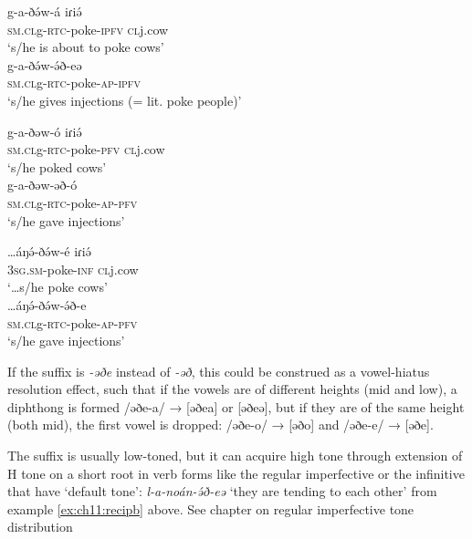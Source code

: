 \ea
\ea \gll 	g-a-ðə́w-á 			iɾiə́  		\\
	\textsc{sm.cl}g-\textsc{rtc}-poke-\textsc{ipfv}  	\textsc{cl}j.cow\\
	\trans ‘s/he is about to poke cows’\\

\ex \gll	g-a-ðə́w-ə́ð-eə  		\\
	\textsc{sm.cl}g-\textsc{rtc}-poke-\textsc{ap-\textsc{ipfv}}  \\
	\trans ‘s/he gives injections (= lit.  poke people)’\\ \label{ex:ch11:eab}

\ex \gll 	g-a-ðəw-ó 			iɾiə́		\\
	\textsc{sm.cl}g-\textsc{rtc}-poke-\textsc{pfv}  		\textsc{cl}j.cow\\
	\trans 	‘s/he poked cows’\\

\ex \gll 	g-a-ðəw-əð-ó		\\
	\textsc{sm.cl}g-\textsc{rtc}-poke-\textsc{ap-\textsc{pfv}}  		 \\
	\trans ‘s/he gave injections’\\ \label{ex:ch11:eab}

\ex \gll 	…áŋə́-ðə́w-é 			iɾiə́		\\
	3\textsc{sg.sm}-poke-\textsc{inf}  		\textsc{cl}j.cow\\
	\trans 	‘…s/he poke cows’\\

\ex \gll 	…áŋə́-ðə́w-ə́ð-e	\\
	\textsc{sm.cl}g-\textsc{rtc}-poke-\textsc{ap-\textsc{pfv}}  		 \\
	\trans ‘s/he gave injections’	\\ \label{ex:ch11:eaf}
\z
\z


If the suffix is \textit{-əðe} instead of \textit{-əð}, this could be construed as a vowel-hiatus resolution effect, such that if the vowels are of different heights (mid and low), a diphthong is formed /əðe-a/ → [əðea] or [əðeə], but if they are of the same height (both mid), the first vowel is dropped: /əðe-o/ → [əðo] and /əðe-e/ → [əðe]. 

The suffix is usually low-toned, but it can acquire high tone through extension of H tone on a short root in verb forms like the regular imperfective or the infinitive that have ‘default tone’:  \textit{l-a-noán-ə́ð-eə}  ‘they are tending to each other’ from example \ref{ex:ch11:recipb} above. See chapter on regular imperfective tone distribution

